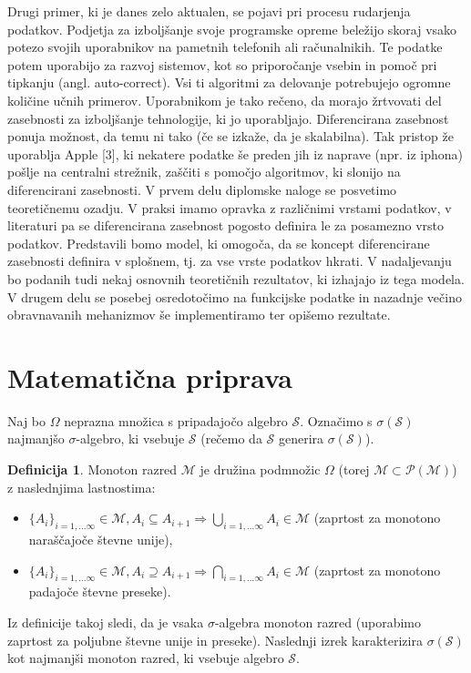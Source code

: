 \documentclass[12pt,a4paper]{amsart}
\theoremstyle{definition} %
\newtheorem{definicija}{Definicija}[section]
\theoremstyle{plain} %
\begin{document}
\newline
\newline
Drugi primer, ki je danes zelo aktualen, se pojavi pri procesu rudarjenja podatkov. Podjetja za izboljšanje svoje programske opreme beležijo skoraj vsako potezo svojih uporabnikov na pametnih telefonih ali računalnikih. Te podatke potem uporabijo za razvoj sistemov, kot so priporočanje vsebin in pomoč pri tipkanju (angl. auto-correct). Vsi ti algoritmi za delovanje potrebujejo ogromne količine učnih primerov. Uporabnikom je tako rečeno, da morajo žrtvovati del zasebnosti za izboljšanje tehnologije, ki jo uporabljajo. Diferencirana zasebnost ponuja možnost, da temu ni tako (če se izkaže, da je skalabilna). Tak pristop že uporablja Apple [3], ki nekatere podatke še preden jih iz naprave (npr. iz iphona) pošlje na centralni strežnik, zaščiti s pomočjo algoritmov, ki slonijo na diferencirani zasebnosti. 
\newline
\newline
V prvem delu diplomske naloge se posvetimo teoretičnemu ozadju. V praksi imamo opravka z različnimi vrstami podatkov, v literaturi pa se diferencirana zasebnost pogosto definira le za posamezno vrsto podatkov. Predstavili bomo model, ki omogoča, da se koncept diferencirane zasebnosti definira v splošnem, tj. za vse vrste podatkov hkrati. V nadaljevanju bo podanih tudi nekaj osnovnih teoretičnih rezultatov, ki izhajajo iz tega modela. V drugem delu se posebej osredotočimo na funkcijske podatke in nazadnje večino obravnavanih mehanizmov še implementiramo ter opišemo rezultate.

\section{Matematična priprava}

Naj bo $\Omega$ neprazna množica s pripadajočo algebro $\mathcal{S}$. Označimo s $\sigma(\mathcal{S})$ najmanjšo $\sigma$-algebro, ki vsebuje $\mathcal{S}$ (rečemo da $\mathcal{S}$ generira $\sigma(\mathcal{S})$).
\begin{definicija}
Monoton razred $\mathcal{M}$ je družina podmnožic $\Omega$ (torej $\mathcal{M} \subset \mathcal{P(\mathcal{M})}$) z naslednjima lastnostima:
\begin{itemize}
\item  $\{A_i\}_{i=1,...\infty} \in \mathcal{M}, A_i \subseteq A_{i+1} \Rightarrow \bigcup_{i=1,...\infty} A_i \in \mathcal{M}$ (zaprtost za monotono naraščajoče števne unije),
\item  $\{A_i\}_{i=1,...\infty} \in \mathcal{M}, A_i \supseteq A_{i+1} \Rightarrow \bigcap_{i=1,...\infty} A_i \in \mathcal{M}$ (zaprtost za monotono padajoče števne preseke).
\end{itemize}
\end{definicija}
Iz definicije takoj sledi, da je vsaka $\sigma$-algebra monoton razred (uporabimo zaprtost za poljubne števne unije in preseke). Naslednji izrek karakterizira $\sigma(\mathcal{S})$ kot najmanjši monoton razred, ki vsebuje algebro $\mathcal{S}$.
\end{document}
